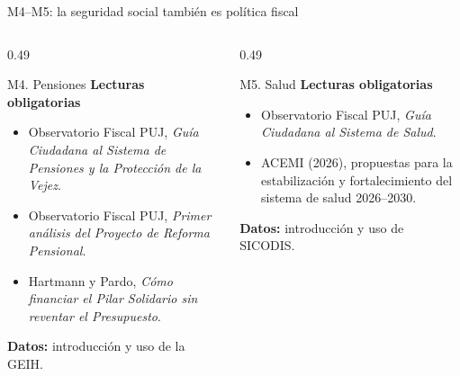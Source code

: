 \begin{frame}{M4--M5: la seguridad social tambi\'en es pol\'itica fiscal}
\scriptsize
\begin{columns}[T,onlytextwidth]
  \begin{column}{0.49\textwidth}
    \begin{block}{M4. Pensiones}
      \textbf{Lecturas obligatorias}
      \begin{itemize}
        \item Observatorio Fiscal PUJ, \textit{Gu\'ia Ciudadana al Sistema de Pensiones y la Protecci\'on de la Vejez}.
        \item Observatorio Fiscal PUJ, \textit{Primer an\'alisis del Proyecto de Reforma Pensional}.
        \item Hartmann y Pardo, \textit{C\'omo financiar el Pilar Solidario sin reventar el Presupuesto}.
      \end{itemize}
      \textbf{Datos:} introducci\'on y uso de la GEIH.
    \end{block}
  \end{column}
  \begin{column}{0.49\textwidth}
    \begin{block}{M5. Salud}
      \textbf{Lecturas obligatorias}
      \begin{itemize}
        \item Observatorio Fiscal PUJ, \textit{Gu\'ia Ciudadana al Sistema de Salud}.
        \item ACEMI (2026), propuestas para la estabilizaci\'on y fortalecimiento del sistema de salud 2026--2030.
      \end{itemize}
      \textbf{Datos:} introducci\'on y uso de SICODIS.
    \end{block}
  \end{column}
\end{columns}
\end{frame}

